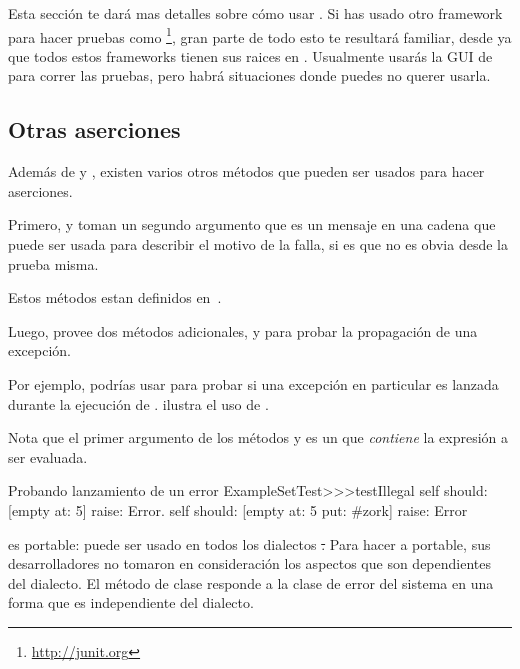 \documentclass[a4paper,10pt,twoside]{book}
\begin{document}
Esta secci\'on te dar\'a mas detalles sobre c\'omo usar \SUnit.  Si has usado
otro framework para hacer pruebas como \Junit\footnote{\url{http://junit.org}},
gran parte de todo esto te resultar\'a familiar, desde ya que todos estos frameworks tienen
sus raices en \SUnit.
Usualmente usar\'as la GUI de \SUnit para correr las pruebas, pero 
habr\'a situaciones donde puedes no querer usarla.


\subsection{Otras aserciones}
Adem\'as de  y , existen varios otros m\'etodos que pueden
ser usados para hacer aserciones.

Primero,  y  toman un segundo
argumento que es un mensaje en una cadena que puede ser usada para describir el motivo de la falla,
si es que no es obvia desde la prueba misma.

Estos m\'etodos estan definidos en~.

Luego, \sunit provee dos m\'etodos adicionales,  y 
para probar la propagaci\'on de una excepci\'on. 

Por ejemplo, podr\'ias usar 
para probar si una excepci\'on en particular es lanzada durante la
ejecuci\'on de .  ilustra el uso de \mbox{.}



Nota que el primer argumento de los m\'etodos  y  es un
 que \emph{contiene} la expresi\'on a ser evaluada.

\begin{method}[ESTtestIllegal]{Probando lanzamiento de un error}
ExampleSetTest>>>testIllegal
	self should: [empty at: 5] raise: Error.
	self should: [empty at: 5 put: #zork] raise: Error
\end{method}

\sunit es portable: puede ser usado en todos los dialectos \st.  Para hacer a \sunit portable,
sus desarrolladores no tomaron en consideraci\'on los aspectos que son dependientes
del dialecto. El m\'etodo de clase  responde a la clase
de error del sistema en una forma que es independiente del dialecto.
\end{document}
